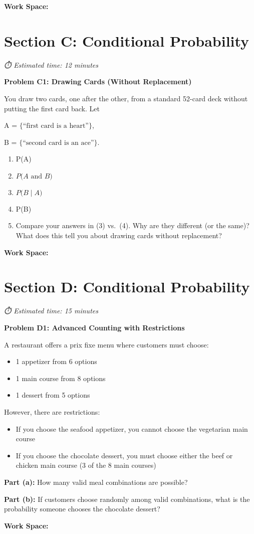 \documentclass[
  11pt,
]{article}
\begin{document}
\textbf{Work Space:}

\section{Section C: Conditional
Probability}\label{section-c-conditional-probability}

\emph{⏱️ Estimated time: 12 minutes}

\textbf{Problem C1: Drawing Cards (Without Replacement)}

You draw two cards, one after the other, from a standard 52-card deck
without putting the first card back. Let

A = \(\{\text{“first card is a heart”}\}\),

B = \(\{\text{“second card is an ace”}\}\).

\begin{enumerate}
\def\labelenumi{\arabic{enumi}.}
\item
  P(A)
\item
  \(P\bigl(A\text{ and }B\bigr)\)
\item
  \(P\bigl(B\mid A\bigr)\)
\item
  P(B)
\item
  Compare your answers in (3) vs.~(4). Why are they different (or the
  same)? What does this tell you about drawing cards without
  replacement?
\end{enumerate}

\textbf{Work Space:}

\section{Section D: Conditional
Probability}\label{section-d-conditional-probability}

\emph{⏱️ Estimated time: 15 minutes}

\textbf{Problem D1: Advanced Counting with Restrictions}

A restaurant offers a prix fixe menu where customers must choose:

\begin{itemize}
\item
  1 appetizer from 6 options
\item
  1 main course from 8 options
\item
  1 dessert from 5 options
\end{itemize}

However, there are restrictions:

\begin{itemize}
\item
  If you choose the seafood appetizer, you cannot choose the vegetarian
  main course
\item
  If you choose the chocolate dessert, you must choose either the beef
  or chicken main course (3 of the 8 main courses)
\end{itemize}

\textbf{Part (a):} How many valid meal combinations are possible?

\textbf{Part (b):} If customers choose randomly among valid
combinations, what is the probability someone chooses the chocolate
dessert?

\textbf{Work Space:}
\end{document}
